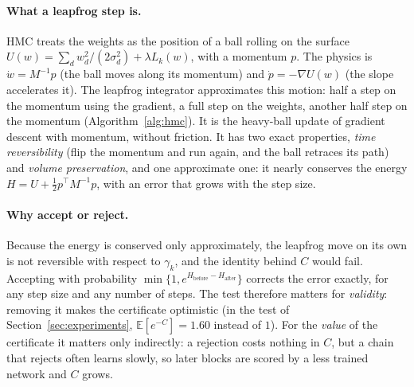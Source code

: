 \documentclass[11pt]{article}
\theoremstyle{definition}
\theoremstyle{remark}
\newcommand{\E}{\mathbb{E}}
\begin{document}
\paragraph{What a leapfrog step is.} HMC treats the weights as the position of a ball rolling on the surface
$U(w)=\sum_dw_d^2/(2\sigma_d^2)+\lambda L_k(w)$, with a momentum $p$. The physics is $\dot w=M^{-1}p$ (the ball moves along its
momentum) and $\dot p=-\nabla U(w)$ (the slope accelerates it). The leapfrog integrator approximates this motion: half a
step on the momentum using the gradient, a full step on the weights, another half step on the momentum
(Algorithm~\ref{alg:hmc}). It is the heavy-ball update of gradient descent with momentum, without friction. It has two
exact properties, \emph{time reversibility} (flip the momentum and run again, and the ball retraces its path) and
\emph{volume preservation}, and one approximate one: it nearly conserves the energy $H=U+\frac12p^\top M^{-1}p$, with an error
that grows with the step size.

\paragraph{Why accept or reject.} Because the energy is conserved only approximately, the leapfrog move on its own is not
reversible with respect to $\gamma_k$, and the identity behind $C$ would fail. Accepting with probability
$\min\{1,e^{H_{\text{before}}-H_{\text{after}}}\}$ corrects the error exactly, for any step size and any number of steps. The
test therefore matters for \emph{validity}: removing it makes the certificate optimistic (in the test of
Section~\ref{sec:experiments}, $\E[e^{-C}]=1.60$ instead of $1$). For the \emph{value} of the certificate it matters only
indirectly: a rejection costs nothing in $C$, but a chain that rejects often learns slowly, so later blocks are scored by
a less trained network and $C$ grows.
\end{document}

